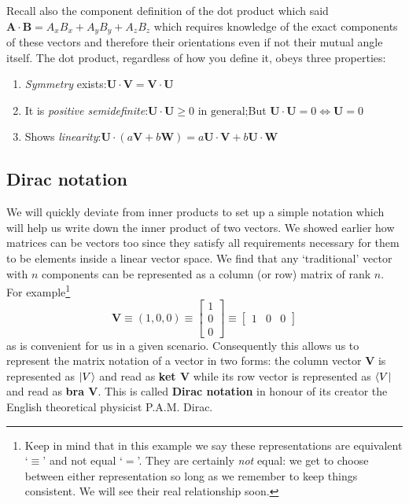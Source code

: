 \documentclass[english,seminar,headertitle]{lecture}
\begin{document}
Recall also the component definition of the dot product which said $\mathbf{A \cdot B} = A_xB_x + A_yB_y + A_zB_z$ which requires knowledge of the exact components of these vectors and therefore their orientations even if not their mutual angle itself. The dot product, regardless of how you define it, obeys three properties:
\begin{multicols}{2}
\begin{enumerate}
	\item \textit{Symmetry} exists:\nl$\mathbf{U \cdot V} = \mathbf{V \cdot U}$
	\item It is \textit{positive semidefinite}:\nl$\mathbf{U\cdot U} \ge 0 \textrm{ in general;}$\nl But $\mathbf{U\cdot U} = 0 \iff \mathbf{U} = 0$
	\columnbreak
	\item Shows \textit{linearity}:\nl$\mathbf{U}\cdot \left(a\mathbf{V} + b\mathbf{W}\right) = a\mathbf{U \cdot V} + b\mathbf{U \cdot W}$
\end{enumerate}
\end{multicols}

\subsection{Dirac notation}

We will quickly deviate from inner products to set up a simple notation which will help us write down the inner product of two vectors. We showed earlier how matrices can be vectors too since they satisfy all requirements necessary for them to be elements inside a linear vector space. We find that any `traditional' vector with $n$ components can be represented as a column (or row) matrix of rank $n$. For example\footnote{Keep in mind that in this example we say these representations are equivalent `$\equiv $' and not equal `$=$'. They are certainly \textit{not} equal: we get to choose between either representation so long as we remember to keep things consistent. We will see their real relationship soon. }
\[
	\mathbf{V} \equiv (1, 0, 0) \equiv
	\begin{bmatrix}
		1 \\ 0 \\ 0
	\end{bmatrix}
	\equiv
	\begin{bmatrix}
		1 & 0 & 0
	\end{bmatrix}
\]
as is convenient for us in a given scenario. Consequently this allows us to represent the matrix notation of a vector in two forms: the column vector $\mathbf{V}$ is represented as $\ket{V}$ and read as \textbf{ket V} while its row vector is represented as $\bra{V}$ and read as \textbf{bra V}. This is called \textbf{Dirac notation} in honour of its creator the English theoretical physicist P.A.M. Dirac.
\end{document}
